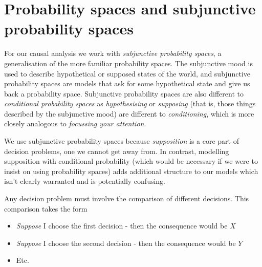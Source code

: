 


\section{Probability spaces and subjunctive probability spaces}

For our causal analysis we work with \emph{subjunctive probability spaces}, a generalisation of the more familiar probability spaces. The subjunctive mood is used to describe hypothetical or supposed states of the world, and subjunctive probability spaces are models that ask for some hypothetical state and give us back a probability space. Subjunctive probability spaces are also different to \emph{conditional probability spaces} \citet{renyi_conditional_1956} as \emph{hypothesising} or \emph{supposing} (that is, those things described by the subjunctive mood) are different to \emph{conditioning}, which is more closely analogous to \emph{focussing your attention}.

We use subjunctive probability spaces because \emph{supposition} is a core part of decision problems, one we cannot get away from. In contrast, modelling supposition with conditional probability (which would be necessary if we were to insist on using probability spaces) adds additional structure to our models which isn't clearly warranted and is potentially confusing.

Any decision problem must involve the comparison of different decisions. This comparison takes the form
\begin{itemize}
	\item \emph{Suppose} I choose the first decision - then the consequence would be $X$
	\item \emph{Suppose} I choose the second decision - then the consequence would be $Y$
	\item Etc.
\end{itemize}

